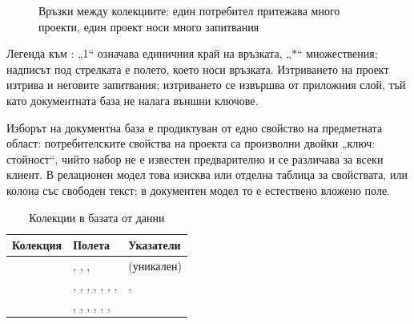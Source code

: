 \begin{figure}[htbp]
\centering
{}
\caption{Връзки между колекциите: един потребител притежава много проекти, един проект носи много запитвания}
\label{fig:er}
\end{figure}

Легенда към : „1“ означава единичния край на връзката, „$\ast$“ множествения;
надписът под стрелката е полето, което носи връзката. Изтриването на проект изтрива и
неговите запитвания; изтриването се извършва от приложния слой, тъй като документната
база не налага външни ключове.

Изборът на документна база е продиктуван от едно свойство на предметната област:
потребителските свойства на проекта са произволни двойки „ключ: стойност“, чийто набор
не е известен предварително и се различава за всеки клиент. В релационен модел това
изисква или отделна таблица за свойствата, или колона със свободен текст; в документен
модел то е естествено вложено поле.

\begin{table}[htbp]
\centering
\caption{Колекции в базата от данни}
\label{tab:collections}
{\fontsize{10}{12}\selectfont
\begin{tabular}{@{}L{2.4cm}L{6.6cm}L{4.0cm}@{}}
\toprule
\textbf{Колекция} & \textbf{Полета} & \textbf{Указатели} \\
\midrule
{} & , , ,  &  (уникален) \\
 & , , , , , , ,  & ,  \\
 & , , , , , ,  &  \\
\bottomrule
\end{tabular}}
\end{table}


